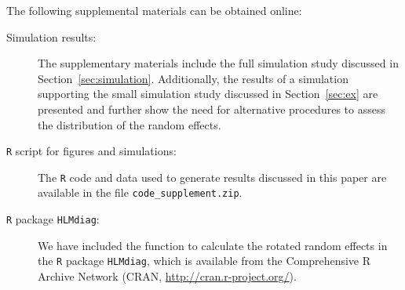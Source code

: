 \documentclass[12pt]{article} %
\begin{document}
The following supplemental materials can be obtained online:

\begin{description}
\item[Simulation results:] The supplementary materials include the full simulation study discussed in Section~\ref{sec:simulation}. Additionally, the results of a simulation supporting the small simulation study discussed in Section~\ref{sec:ex} are presented and further show the need for alternative procedures to assess the distribution of the random effects.

\item[\texttt{R} script for figures and simulations:] The \texttt{R} code and data used to generate results discussed in this paper are available in the file \texttt{code\_supplement.zip}. 

\item[\texttt{R} package \texttt{HLMdiag}:] We have included the function to calculate the rotated random effects in the \texttt{R} package \texttt{HLMdiag}, which is available from the Comprehensive R Archive Network (CRAN, \url{http://cran.r-project.org/}).
\end{description}



\end{document}
